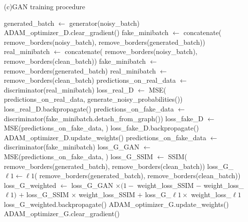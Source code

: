 \begin{algorithm}
\caption{(c)GAN training procedure}\label{alg:gantrain}
\begin{algorithmic}[1]
\STATE generated\_batch $\leftarrow$ generator(noisy\_batch) 
\STATE {}
\STATE {}
\STATE ADAM\_optimizer\_D.clear\_gradient()
\STATE fake\_minibatch $\leftarrow$ concatenate(
\STATE \quad remove\_borders(noisy\_batch),
\STATE \quad remove\_borders(generated\_batch))
\STATE real\_minibatch $\leftarrow$ concatenate(
\STATE \quad remove\_borders(noisy\_batch),
\STATE \quad remove\_borders(clean\_batch))
\ELSE
\STATE fake\_minibatch $\leftarrow$ remove\_borders(generated\_batch)
\STATE real\_minibatch $\leftarrow$ remove\_borders(clean\_batch)
\ENDIF
\STATE predictions\_on\_real\_data $\leftarrow$ discriminator(real\_minibatch)
\STATE loss\_real\_D $\leftarrow$ \ac{MSE}(
\STATE \quad predictions\_on\_real\_data,
\STATE \quad generate\_noisy\_probabilities(\TRUE))
\STATE loss\_real\_D.backpropagate()
\STATE predictions\_on\_fake\_data $\leftarrow$
\STATE \quad discriminator(fake\_minibatch.detach\_from\_graph())
\STATE loss\_fake\_D $\leftarrow$ \ac{MSE}(predictions\_on\_fake\_data, \FALSE)
\STATE loss\_fake\_D.backpropagate()
\STATE ADAM\_optimizer\_D.update\_weights()
\ENDIF
\STATE {}
\STATE {}
\STATE predictions\_on\_fake\_data $\leftarrow$ discriminator(fake\_minibatch)
\STATE loss\_G\_GAN $\leftarrow$ \ac{MSE}(predictions\_on\_fake\_data, \TRUE)
\STATE loss\_G\_SSIM $\leftarrow$ \ac{SSIM}(
\STATE \quad remove\_borders(generated\_batch),
\STATE \quad remove\_borders(clean\_batch))
\STATE loss\_G\_$\ell 1\leftarrow \ell 1$(
\STATE \quad remove\_borders(generated\_batch),
\STATE \quad remove\_borders(clean\_batch))
\STATE loss\_G\_weighted $\leftarrow$ 
\STATE \quad loss\_G\_GAN $\times (1- $ weight\_loss\_SSIM $-$ weight\_loss\_$\ell 1)$
\STATE \quad $+$ loss\_G\_SSIM $\times$ weight\_loss\_SSIM
\STATE \quad $+$ loss\_G\_$\ell 1 \times$ weight\_loss\_$\ell 1$
\STATE loss\_G\_weighted.backpropagate()
\STATE ADAM\_optimizer\_G.update\_weights()
\STATE ADAM\_optimizer\_G.clear\_gradient()
\ENDIF
\ENDFOR
\end{algorithmic}
\end{algorithm}
